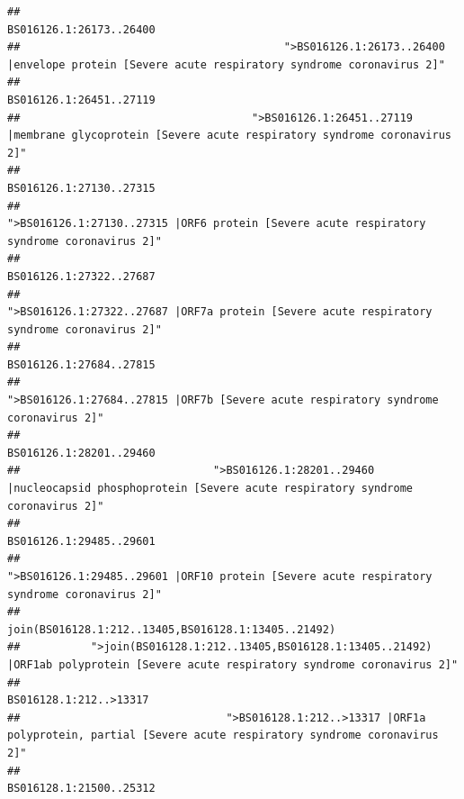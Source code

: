 \documentclass[
]{article}
\begin{document}
\begin{verbatim}
##                                                                                                                BS016126.1:26173..26400 
##                                         ">BS016126.1:26173..26400 |envelope protein [Severe acute respiratory syndrome coronavirus 2]" 
##                                                                                                                BS016126.1:26451..27119 
##                                    ">BS016126.1:26451..27119 |membrane glycoprotein [Severe acute respiratory syndrome coronavirus 2]" 
##                                                                                                                BS016126.1:27130..27315 
##                                             ">BS016126.1:27130..27315 |ORF6 protein [Severe acute respiratory syndrome coronavirus 2]" 
##                                                                                                                BS016126.1:27322..27687 
##                                            ">BS016126.1:27322..27687 |ORF7a protein [Severe acute respiratory syndrome coronavirus 2]" 
##                                                                                                                BS016126.1:27684..27815 
##                                                    ">BS016126.1:27684..27815 |ORF7b [Severe acute respiratory syndrome coronavirus 2]" 
##                                                                                                                BS016126.1:28201..29460 
##                              ">BS016126.1:28201..29460 |nucleocapsid phosphoprotein [Severe acute respiratory syndrome coronavirus 2]" 
##                                                                                                                BS016126.1:29485..29601 
##                                            ">BS016126.1:29485..29601 |ORF10 protein [Severe acute respiratory syndrome coronavirus 2]" 
##                                                                                    join(BS016128.1:212..13405,BS016128.1:13405..21492) 
##           ">join(BS016128.1:212..13405,BS016128.1:13405..21492) |ORF1ab polyprotein [Severe acute respiratory syndrome coronavirus 2]" 
##                                                                                                                 BS016128.1:212..>13317 
##                                ">BS016128.1:212..>13317 |ORF1a polyprotein, partial [Severe acute respiratory syndrome coronavirus 2]" 
##                                                                                                                BS016128.1:21500..25312 

\end{verbatim}
\end{document}
